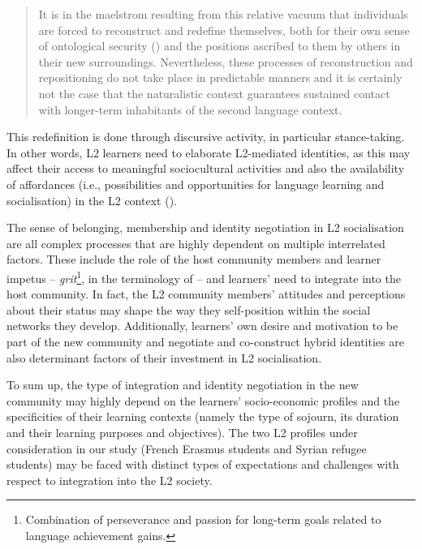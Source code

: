 \documentclass[output=paper]{langscibook}
\begin{document}
\begin{quote}
It is in the maelstrom resulting from this relative vacuum that individuals are forced to reconstruct and redefine themselves, both for their own sense of ontological security (\citealt{Guiddens1991}) and the positions ascribed to them by others in their new surroundings. Nevertheless, these processes of reconstruction and repositioning do not take place in predictable manners and it is certainly not the case that the naturalistic context guarantees sustained contact with longer-term inhabitants of the second language context.\hbox{}\hfill\hbox{\citep[75]{Block2007a}}
\end{quote}

\begin{sloppypar}
This redefinition is done through discursive activity, in particular stance-taking. In other words, L2 learners need to elaborate L2-mediated identities, as this may affect their access to meaningful sociocultural activities and also the availability of affordances (i.e., possibilities and opportunities for language learning and socialisation) in the L2 context (\citealt{Uju2011, Kinginger2013, Strömmer2016, Kinginger2017}).
\end{sloppypar}

The sense of belonging, membership and identity negotiation in L2 socialisation are all complex processes that are highly dependent on multiple interrelated factors. These include the role of the host community members and learner impetus -- \textit{grit}\footnote{Combination of perseverance and passion for long-term goals related to language achievement gains.}, in the terminology of \citet{TeimouriEtAl2022} -- and learners’ need to integrate into the host community. In fact, the L2 community members’ attitudes and perceptions about their status may shape the way they self-position within the social networks they develop. Additionally, learners’ own desire and motivation to be part of the new community and negotiate and co-construct hybrid identities are also determinant factors of their investment in L2 socialisation.

To sum up, the type of integration and identity negotiation in the new community may highly depend on the learners’ socio-economic profiles and the specificities of their learning contexts (namely the type of sojourn, its duration and their learning purposes and objectives). The two L2 profiles under consideration in our study (French Erasmus students and Syrian refugee students) may be faced with distinct types of expectations and challenges with respect to integration into the L2 society.
\end{document}

